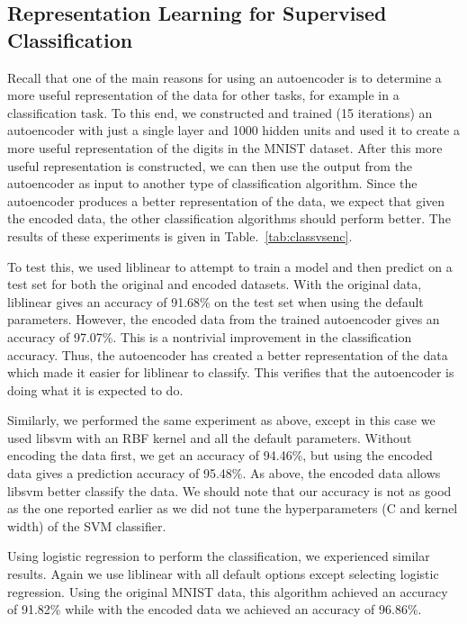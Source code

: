 \subsection{Representation Learning for Supervised Classification}

Recall that one of the main reasons for using an autoencoder is to determine a
more useful representation of the data for other tasks, for example in a
classification task. To this end, we constructed and trained (15 iterations) an
autoencoder with just a single layer and 1000 hidden units and used it to
create a more useful representation of the digits in the MNIST dataset. After
this more useful representation is constructed, we can then use the output from
the autoencoder as input to another type of classification algorithm.  Since
the autoencoder produces a better representation of the data, we expect that
given the encoded data, the other classification algorithms should perform
better.  The results of these experiments is given in
Table.~\ref{tab:classvsenc}.

To test this, we used liblinear \cite{fan2008liblinear} to attempt to train a model and then predict on
a test set for both the original and encoded datasets. With the original data,
liblinear gives an accuracy of 91.68\% on the test set when using the default
parameters. However, the encoded data from the trained autoencoder gives
an accuracy of 97.07\%. This is a nontrivial improvement in the classification
accuracy. Thus, the autoencoder has created a better representation of the data
which made it easier for liblinear to classify. This verifies that the
autoencoder is doing what it is expected to do.

Similarly, we performed the same experiment as above, except in this case we
used libsvm \cite{chang2011libsvm} with an RBF kernel and all the default parameters.  Without
encoding the data first, we get an accuracy of 94.46\%, but using the encoded
data gives a prediction accuracy of 95.48\%. As above, the encoded data allows libsvm
better classify the data. We should note that our accuracy is not as good as the one reported earlier as we did not tune the hyperparameters (C and kernel width) of the SVM classifier. 

Using logistic regression to perform the classification, we experienced similar results.
Again we use liblinear with all default options except selecting logistic regression. Using the
original MNIST data, this algorithm achieved an accuracy of 91.82\% while with the encoded data
we achieved an accuracy of 96.86\%.

